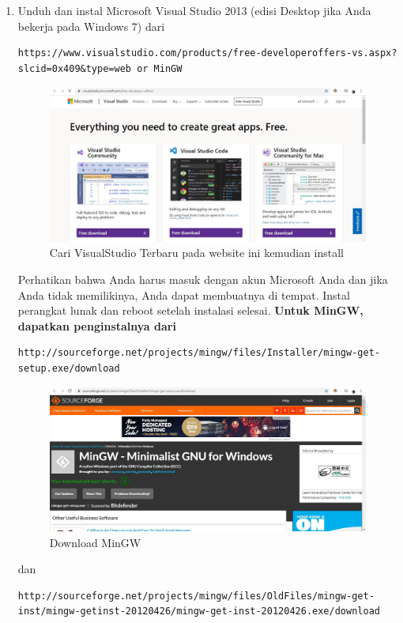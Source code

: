 \begin{enumerate}
\newpage
	\item Unduh dan instal Microsoft Visual Studio 2013 (edisi Desktop jika Anda bekerja pada Windows 7) dari \begin{verbatim}https://www.visualstudio.com/products/free-developeroffers-vs.aspx?slcid=0x409&type=web or MinGW \end{verbatim} 
		\begin{figure}[ht]
		\centering
		\includegraphics[scale=0.3]{figures/1,4.jpg}
		\caption{Cari VisualStudio Terbaru pada website ini kemudian install}
		\label{contoh}
		\end{figure}
	Perhatikan bahwa Anda harus masuk dengan akun Microsoft Anda dan jika Anda tidak memilikinya, Anda dapat membuatnya di tempat. Instal perangkat lunak dan reboot setelah instalasi selesai. 
\newpage
	\textbf{Untuk MinGW, dapatkan penginstalnya dari} \begin{verbatim}http://sourceforge.net/projects/mingw/files/Installer/mingw-get-setup.exe/download \end{verbatim} 
		\begin{figure}[ht]
		\centering
		\includegraphics[scale=0.3]{figures/1,5.jpg}
		\caption{Download MinGW}
		\label{contoh}
		\end{figure}
	dan \begin{verbatim}http://sourceforge.net/projects/mingw/files/OldFiles/mingw-get-inst/mingw-getinst-20120426/mingw-get-inst-20120426.exe/download \end{verbatim} 

\end{enumerate}
